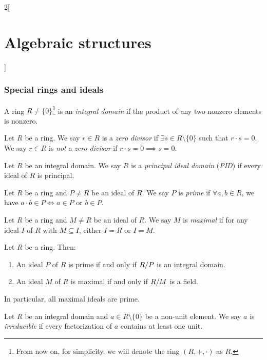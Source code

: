 \documentclass[../../../main.tex]{subfiles}
\begin{document}
\begin{multicols}{2}[\section{Algebraic structures}]
    \subsubsection{Special rings and ideals}
    \begin{definition}
        A ring $R\ne\{0\}$\footnote{From now on, for simplicity, we will denote the ring $(R,+,\cdot)$ as $R$.} is an \textit{integral domain} if the product of any two nonzero elements is nonzero.
    \end{definition}
    \begin{definition}
        Let $R$ be a ring. We say $r\in R$ is a \textit{zero divisor} if $\exists s\in R\setminus\{0\}$ such that $r\cdot s=0$. We say $r\in R$ is \textit{not} a \textit{zero divisor} if $r\cdot s=0\implies s=0$.
    \end{definition}
    \begin{definition}
        Let $R$ be an integral domain. We say $R$ is a \textit{principal ideal domain} (\textit{PID}) if every ideal of $R$ is principal.
    \end{definition}
    \begin{definition}
        Let $R$ be a ring and $P\ne R$ be an ideal of $R$. We say $P$ is \textit{prime} if $\forall a,b\in R$, we have $a\cdot b\in P\iff a\in P\text{ or }b\in P$.
    \end{definition}
    \begin{definition}
        Let $R$ be a ring and $M\ne R$ be an ideal of $R$. We say $M$ is \textit{maximal} if for any ideal $I$ of $R$ with $M\subseteq I$, either $I=R$ or $I=M$.
    \end{definition}
    \begin{prop}
        Let $R$ be a ring. Then:
        \begin{enumerate}
            \item An ideal $P$ of $R$ is prime if and only if $\quot{R}{P}$ is an integral domain.
            \item An ideal $M$ of $R$ is maximal if and only if $\quot{R}{M}$ is a field.
        \end{enumerate}
        In particular, all maximal ideals are prime.
    \end{prop}
    \begin{definition}
        Let $R$ be an integral domain and $a\in R\setminus\{0\}$ be a non-unit element. We say $a$ is \textit{irreducible} if every factorization of $a$ contains at least one unit.
    \end{definition}

\end{multicols}
\end{document}
